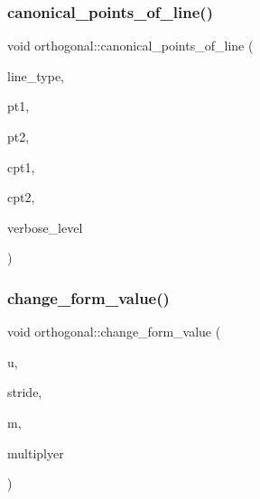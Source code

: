 \subsubsection{\texorpdfstring{canonical\+\_\+points\+\_\+of\+\_\+line()}{canonical\_points\_of\_line()}}
{\footnotesize\ttfamily void orthogonal\+::canonical\+\_\+points\+\_\+of\+\_\+line (\begin{DoxyParamCaption}\item[{\mbox{\hyperlink{galois_8h_a09fddde158a3a20bd2dcadb609de11dc}{I\+NT}}}]{line\+\_\+type,  }\item[{\mbox{\hyperlink{galois_8h_a09fddde158a3a20bd2dcadb609de11dc}{I\+NT}}}]{pt1,  }\item[{\mbox{\hyperlink{galois_8h_a09fddde158a3a20bd2dcadb609de11dc}{I\+NT}}}]{pt2,  }\item[{\mbox{\hyperlink{galois_8h_a09fddde158a3a20bd2dcadb609de11dc}{I\+NT}} \&}]{cpt1,  }\item[{\mbox{\hyperlink{galois_8h_a09fddde158a3a20bd2dcadb609de11dc}{I\+NT}} \&}]{cpt2,  }\item[{\mbox{\hyperlink{galois_8h_a09fddde158a3a20bd2dcadb609de11dc}{I\+NT}}}]{verbose\+\_\+level }\end{DoxyParamCaption})}

\mbox{\label{classorthogonal_a981c26d4b73e152cd884f0b969a581bf}} 
\subsubsection{\texorpdfstring{change\+\_\+form\+\_\+value()}{change\_form\_value()}}
{\footnotesize\ttfamily void orthogonal\+::change\+\_\+form\+\_\+value (\begin{DoxyParamCaption}\item[{\mbox{\hyperlink{galois_8h_a09fddde158a3a20bd2dcadb609de11dc}{I\+NT}} $\ast$}]{u,  }\item[{\mbox{\hyperlink{galois_8h_a09fddde158a3a20bd2dcadb609de11dc}{I\+NT}}}]{stride,  }\item[{\mbox{\hyperlink{galois_8h_a09fddde158a3a20bd2dcadb609de11dc}{I\+NT}}}]{m,  }\item[{\mbox{\hyperlink{galois_8h_a09fddde158a3a20bd2dcadb609de11dc}{I\+NT}}}]{multiplyer }\end{DoxyParamCaption})}

